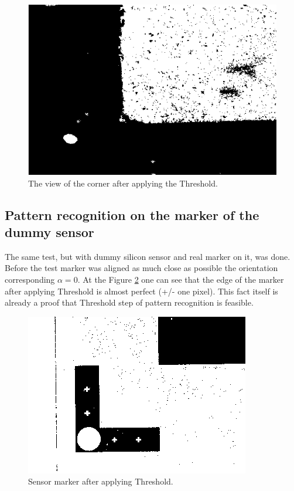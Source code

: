 \begin{figure}[ht]\centering
\includegraphics[width=0.8\linewidth]{Data/Precision_tests/Corner_thresholded.png}
\caption{The view of the corner after applying the Threshold.}
\label{fig:corner_threshold}
\end{figure}

\subsection{Pattern recognition on the marker of the dummy sensor}

The same test, but with dummy silicon sensor and real marker on it, was done. Before the test marker was aligned as much close as possible the orientation corresponding $\alpha=0$. At the Figure \ref{fig:thresholded_marker} one can see that the edge of the marker after applying Threshold is almost perfect (+/- one pixel). This fact itself is already a proof that Threshold step of pattern recognition is feasible.

\begin{figure}[ht]\centering
\includegraphics[width=0.6\linewidth]{Data/Precision_tests/Thresholded_marker.png}
\caption{Sensor marker after applying Threshold.}
\label{fig:thresholded_marker}
\end{figure}

